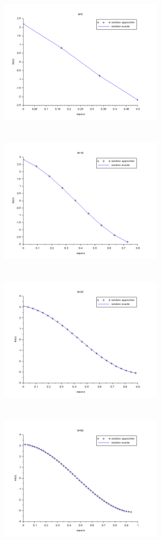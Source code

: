 \documentclass[a4paper,12pt]{article}
\begin{document}
\begin{figure}[h!]
\begin{center}
	\includegraphics[width=225pt,height=200pt]{image/figure_11}
	\includegraphics[width=225pt,height=200pt]{image/figure_12}
	\includegraphics[width=225pt,height=200pt]{image/figure_13}
  \includegraphics[width=225pt,height=200pt]{image/figure_14}

\end{center}
\end{figure}
\end{document}
